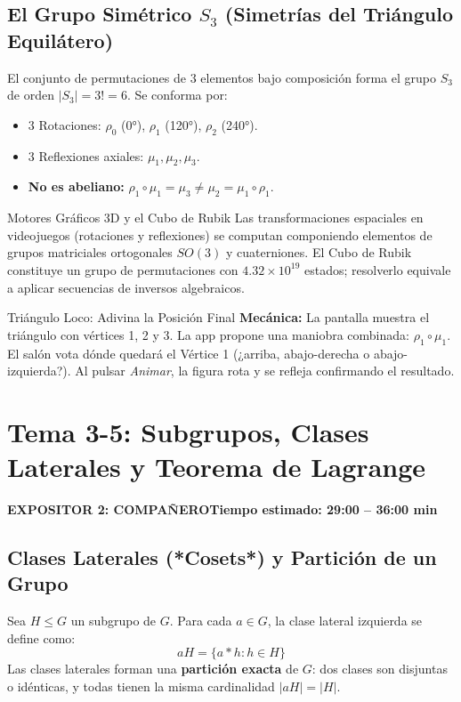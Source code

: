 \documentclass[11pt,a4paper]{article}
\newcommand{\badgeComp}{\colorbox{exp2bg}{\textcolor{exp2fg}{\bfseries\sffamily\footnotesize EXPOSITOR 2: COMPAÑERO}}}
\begin{document}
\subsection{El Grupo Simétrico $S_3$ (Simetrías del Triángulo Equilátero)}
El conjunto de permutaciones de 3 elementos bajo composición forma el grupo $S_3$ de orden $|S_3| = 3! = 6$. Se conforma por:
\begin{itemize}[noitemsep]
  \item 3 Rotaciones: $\rho_0$ (0°), $\rho_1$ (120°), $\rho_2$ (240°).
  \item 3 Reflexiones axiales: $\mu_1, \mu_2, \mu_3$.
  \item \textbf{No es abeliano:} $\rho_1 \circ \mu_1 = \mu_3 \neq \mu_2 = \mu_1 \circ \rho_1$.
\end{itemize}

\begin{aplicacion}{Motores Gráficos 3D y el Cubo de Rubik}
Las transformaciones espaciales en videojuegos (rotaciones y reflexiones) se computan componiendo elementos de grupos matriciales ortogonales $SO(3)$ y cuaterniones. El Cubo de Rubik constituye un grupo de permutaciones con $4.32 \times 10^{19}$ estados; resolverlo equivale a aplicar secuencias de inversos algebraicos.
\end{aplicacion}

\begin{minijuego}{Triángulo Loco: Adivina la Posición Final}
\textbf{Mecánica:} La pantalla muestra el triángulo con vértices 1, 2 y 3. La app propone una maniobra combinada: $\rho_1 \circ \mu_1$. El salón vota dónde quedará el Vértice 1 (¿arriba, abajo-derecha o abajo-izquierda?). Al pulsar \textit{Animar}, la figura rota y se refleja confirmando el resultado.
\end{minijuego}

\newpage

\section{Tema 3-5: Subgrupos, Clases Laterales y Teorema de Lagrange}
\noindent\badgeComp \hfill \textbf{Tiempo estimado: 29:00 -- 36:00 min}

\subsection{Clases Laterales (*Cosets*) y Partición de un Grupo}
Sea $H \le G$ un subgrupo de $G$. Para cada $a \in G$, la clase lateral izquierda se define como:
\begin{equation}
  aH = \{ a * h : h \in H \}
\end{equation}
Las clases laterales forman una \textbf{partición exacta} de $G$: dos clases son disjuntas o idénticas, y todas tienen la misma cardinalidad $|aH| = |H|$.
\end{document}
